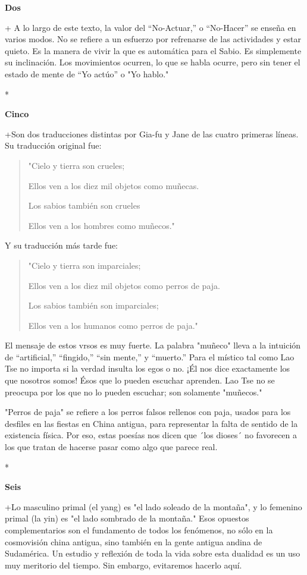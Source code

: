 \textbf{Dos}

+ A lo largo de este texto, la valor del ``No-Actuar,'' o ``No-Hacer''
se enseña en varios modos. No se refiere a un esfuerzo por refrenarse de
las actividades y estar quieto. Es la manera de vivir la que es
automática para el Sabio. Es simplemente su inclinación. Los movimientos
ocurren, lo que se habla ocurre, pero sin tener el estado de mente de
``Yo actúo'' o "Yo hablo."

*

\textbf{Cinco}

+Son dos traducciones distintas por Gia-fu y Jane de las cuatro primeras
líneas. Su traducción original fue:

\begin{quote}
"Cielo y tierra son crueles;

Ellos ven a los diez mil objetos como muñecas.

Los sabios también son crueles

Ellos ven a los hombres como muñecos."
\end{quote}

Y su traducción más tarde fue:

\begin{quote}
"Cielo y tierra son imparciales;

Ellos ven a los diez mil objetos como perros de paja.

Los sabios también son imparciales;

Ellos ven a los humanos como perros de paja."
\end{quote}

El mensaje de estos vrsos es muy fuerte. La palabra "muñeco" lleva a la
intuición de ``artificial,'' ``fingido,'' ``sin mente,'' y ``muerto.''
Para el místico tal como Lao Tse no importa si la verdad insulta los
egos o no. ¡Él nos dice exactamente los que nosotros somos! Ésos que lo
pueden escuchar aprenden. Lao Tse no se preocupa por los que no lo
pueden escuchar; son solamente "muñecos."

"Perros de paja" se refiere a los perros falsos rellenos con paja,
usados para los desfiles en las fiestas en China antigua, para
representar la falta de sentido de la existencia física. Por eso, estas
poesías nos dicen que ´los dioses´ no favorecen a los que tratan de
hacerse pasar como algo que parece real.

*

\textbf{Seis}

+Lo masculino primal (el yang) es "el lado soleado de la montaña", y lo
femenino primal (la yin) es "el lado sombrado de la montaña." Esos
opuestos complementarios son el fundamento de todos los fenómenos, no
sólo en la cosmovisión china antigua, sino también en la gente antigua
andina de Sudamérica. Un estudio y reflexión de toda la vida sobre esta
dualidad es un uso muy meritorio del tiempo. Sin embargo, evitaremos
hacerlo aquí.

